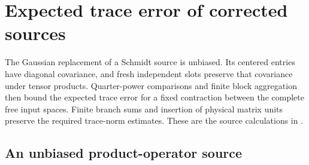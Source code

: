 
\section{Expected trace error of corrected sources}\label{ch:source_error}

The Gaussian replacement of a Schmidt source is unbiased. Its centered
entries have diagonal covariance, and fresh independent slots preserve
that covariance under tensor products. Quarter-power comparisons and
finite block aggregation then bound the expected trace error for a fixed
contraction between the complete free input spaces.
Finite branch sums and insertion of physical matrix units preserve the
required trace-norm estimates.
These are the source calculations in
\cite[Theorem~5.2]{OpenAI2026PolynomialPEPS}.

\subsection{An unbiased product-operator source}

